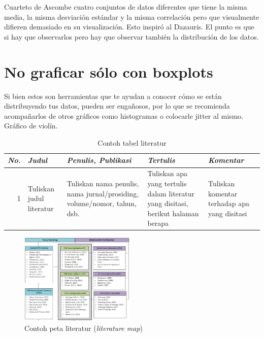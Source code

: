 \documentclass[conference, a4paper]{IEEEtran_ID}
\begin{document}
Cuarteto de Ascombe cuatro conjuntos de datos diferentes que tiene la misma media, la misma desviación estándar y la misma correlación pero que visualmente difieren demasiado en su visualización. Esto inspiró al Dazauris. El punto es que si hay que observarlos pero hay que observar también la distribución de los datos. 

\section{No graficar sólo con boxplots}

Si bien estos son herramientas que te ayudan a conocer cómo se están distribuyendo tus datos, pueden ser engañosos, por lo que se recomienda acompañarlos de otros gráficos como histogramas o colocarle jitter al mismo. Gráfico de violín. 



	\begin{table}[htbp]
		\caption{Contoh tabel literatur}
		\begin{center}
		\begin{tabular}{|r|p{1.5cm}|p{1.8cm}|p{1.5cm}|p{1.5cm}|}
			\hline
			\textbf{\textit{No.}} & \textbf{\textit{Judul}} & \textbf{\textit{Penulis, Publikasi}} & \textbf{\textit{Tertulis}} & \textbf{\textit{Komentar}} \\
			\hline
			1 & Tuliskan judul literatur & Tuliskan nama penulis, nama 
			jurnal/prosiding, volume/nomor, tahun, dsb. & Tuliskan apa yang 
			tertulis dalam literatur yang disitasi, berikut halaman berapa & %
			Tuliskan komentar terhadap apa yang disitasi \\[2ex]
			\hline
		\end{tabular}
		\label{lit_table}
		\end{center}
	\end{table}

	\begin{figure}[htbp]
		\centerline{\includegraphics[width=0.49\textwidth]{litmap.png}}
		\caption{Contoh peta literatur (\textit{literature map})}
		\label{lit_map}
	\end{figure}
\end{document}

